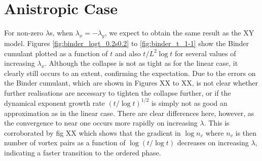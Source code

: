 \section{Anistropic Case} 
For non-zero $\lambda$s, when $\lambda_x = - \lambda_y$, we expect to obtain the same result as the XY model. Figures \ref{fig:binder_logt_0.2s0.2} to \ref{fig:binder_t_1-1} show the Binder cumulant plotted as a function of $t$ and also $t/ L^2 \log t$ for several values of increasing $\lambda_x$. Although the collapse is not as tight as for the linear case, it clearly still occurs to an extent, confirming the expectation. Due to the errors on the Binder cumulant, which are shown in Figures XX to XX, is not clear whether further realisations are necessary to tighten the collapse further, or if the dynamical exponent growth rate $(t/\log t)^{1/2}$ is simply not as good an approximation as in the linear case.  There are clear differences here, however, as the convergence to near one occurs more rapidly on increasing $\lambda$. This is corroborated by fig XX which shows that the gradient in $\log n_v$ where $n_v$ is then number of vortex pairs as a function of $\log (t / \log t)$ decreases on increasing $\lambda$, indicating a faster transition to the ordered phase.   

